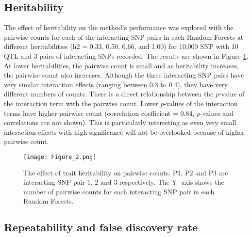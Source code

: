 \documentclass[preprint,12pt,3p]{elsarticle}
\begin{document}
\subsection{Heritability}

The effect of heritability on the method's performance was explored with the pairwise counts for each of the
interacting SNP pairs in each Random Forests at different heritabilities (h2 = 0.33, 0.50, 0.66, and 1.00) for 10,000
SNP with 10 QTL and 3 pairs of interacting SNPs recorded. The results are shown in Figure \ref{figure:Eff_Trait_h2_simulated_data.png}. At lower heritabilities,
the pairwise count is small and as heritability increases, the pairwise count also increases. Although the three
interacting SNP pairs have very similar interaction effects (ranging between 0.3 to 0.4), they have very different
numbers of counts. There is a direct relationship between the $p$-value of the interaction term with the pairwise
count. Lower $p$-values of the interaction terms have higher pairwise count (correlation coefficient = 0.84, $p$-values
and correlations are not shown). This is particularly interesting as even very small interaction effects with high
significance will not be overlooked because of higher pairwise count.



\begin{figure}[thbp]
    \begin{center}
  \centering
\texttt{[image: Figure\_2.png]}
\caption{ The effect of trait heritability on pairwise counts. P1, P2 and P3 are interacting SNP pair 1, 2 and 3 respectively.
The Y- axis shows the number of pairwise counts for each interacting SNP pair in each Random Forests.}
  \label{figure:Eff_Trait_h2_simulated_data.png} 
    \end{center}
\end{figure}


\subsection{Repeatability and false discovery rate}
\end{document}
